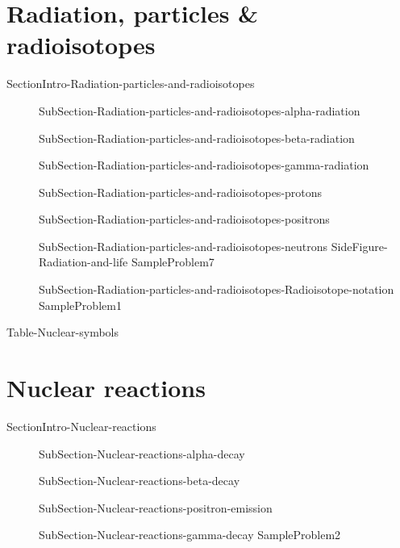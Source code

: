 \documentclass[main.tex]{subfiles}
\newcommand\chapterlabel{Ch-nuclear}\setcounter{figurenewcounter}{0}\setcounter{tablenewcounter}{0}\setcounter{formulanewcounter}{0}\chapterpicture{../{\chapterlabel}/figure1}\chapterpicturelabel{PxFuel}
\begin{document}
\section{Radiation, particles \& radioisotopes}{SectionIntro-Radiation-particles-and-radioisotopes}
\sloppy \begin{description}
\item[] {SubSection-Radiation-particles-and-radioisotopes-alpha-radiation}
\item[] {SubSection-Radiation-particles-and-radioisotopes-beta-radiation}
\item[] {SubSection-Radiation-particles-and-radioisotopes-gamma-radiation}
\item[] {SubSection-Radiation-particles-and-radioisotopes-protons}
\item[] {SubSection-Radiation-particles-and-radioisotopes-positrons}
\item[] {SubSection-Radiation-particles-and-radioisotopes-neutrons}
{SideFigure-Radiation-and-life}
  {SampleProblem7}
\item[]  {SubSection-Radiation-particles-and-radioisotopes-Radioisotope-notation}
  {SampleProblem1}
\end{description}
\newpage\vspace{10cm}\begin{fullwidth}{Table-Nuclear-symbols}\end{fullwidth}

 
 
 
 
 

\section{Nuclear reactions}{SectionIntro-Nuclear-reactions}
\sloppy \begin{description}
\item[] {SubSection-Nuclear-reactions-alpha-decay}
\item[] {SubSection-Nuclear-reactions-beta-decay}
\item[] {SubSection-Nuclear-reactions-positron-emission}
\item[] {SubSection-Nuclear-reactions-gamma-decay}
  {SampleProblem2}
\end{description}
\end{document}
